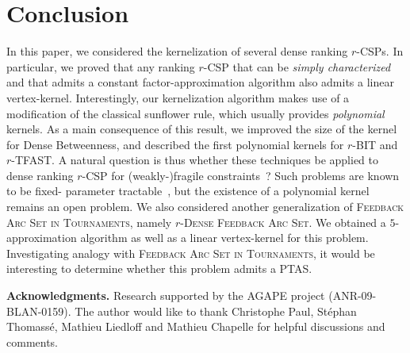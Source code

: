 \documentclass[11pt]{article}
\newcommand{\BIT}{{\sc Dense Betweenness}}
\newcommand{\FAST}{\textsc{Feedback Arc Set in Tournaments}}
\newcommand{\FASHT}{\textsc{$r$-Dense Feedback Arc Set}}
\begin{document}
\section{Conclusion}

In this paper, we considered the kernelization of several dense ranking $r$-CSPs. 
In particular, we proved that any ranking $r$-CSP that can be \emph{simply characterized} and that 
admits a constant factor-approximation algorithm also admits a linear vertex-kernel. Interestingly, our kernelization algorithm makes use of a modification of the classical 
sunflower rule, which usually provides \emph{polynomial} kernels.  
As a main consequence of this result, we improved the size of the kernel for \BIT{}, and described the first polynomial kernels for {\sc $r$-BIT} and {\sc $r$-TFAST}. 
A natural question is thus whether these techniques be applied 
to dense ranking $r$-CSP for (weakly-)fragile constraints~\cite{KS11}? Such problems are known to be fixed-
parameter tractable~\cite{KS10}, but the existence of a polynomial kernel remains an 
open problem. We also considered another generalization of \FAST{}, namely \FASHT{}. We obtained a $5$-approximation algorithm as well as a linear vertex-kernel for this problem. Investigating analogy with \FAST{}, it would be interesting to determine whether this problem admits a PTAS. \\

{\small

\noindent \textbf{Acknowledgments.} Research supported by the AGAPE project  (ANR-09-BLAN-0159). The author would like to thank Christophe Paul, St\'ephan Thomass\'e,  Mathieu Liedloff and Mathieu Chapelle for helpful discussions and comments. 



}
\end{document}
